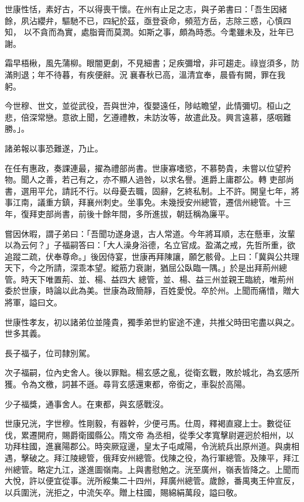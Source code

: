 \begin{pinyinscope}
 世康性恬，素好古，不以得喪干懷。在州有止足之志，與子弟書曰：「吾生因緒餘，夙沾纓弁，驅馳不已，四紀於茲，亟登袞命，頻蒞方岳，志除三惑，心慎四知，
 以不貪而為實，處脂膏而莫潤。如斯之事，頗為時悉。今耄雖未及，壯年已謝。



 霜早梧楸，風先蒲柳。眼闇更劇，不見細書；足疾彌增，非可趨走。祿豈須多，防滿則退；年不待暮，有疾便辭。況襄春秋已高，溫清宜奉，晨昏有闕，罪在我躬。



 今世穆、世文，並從武役，吾與世沖，復嬰遠任，陟岵瞻望，此情彌切。桓山之悲，倍深常戀。意欲上聞，乞遵禮教，未訪汝等，故遣此及。興言遠慕，感咽難勝。」。



 諸弟報以事恐難遂，乃止。



 在任有惠政，奏課連最，擢為禮部尚書。世康寡嗜慾，不慕勢貴，未嘗以位望矜物。聞人之善，若己有之，亦不顯人過咎，以求名譽。進爵上庸郡公。轉
 吏部尚書，選用平允，請託不行。以母憂去職，固辭，乞終私制。上不許。開皇七年，將事江南，議重方鎮，拜襄州刺史。坐事免。未幾授安州總管，遷信州總管。十三年，復拜吏部尚書，前後十餘年間，多所進拔，朝廷稱為廉平。



 嘗因休暇，謂子弟曰：「吾聞功遂身退，古人常道。今年將耳順，志在懸車，汝輩以為云何？」子福嗣答曰：「大人澡身浴德，名立官成。盈滿之戒，先哲所重，欲追蹤二疏，伏奉尊命。」後因侍宴，世康再拜陳讓，願乞骸骨。上曰：「冀與公共理天下，今之所請，深乖本望。縱筋力衰謝，猶屈公臥臨一隅。」於是出拜荊州總管。時天下唯置荊、並、楊、益四大
 總管，並、楊、益三州並親王臨統，唯荊州委於世康，時論以此為美。世康為政簡靜，百姓愛悅。卒於州。上聞而痛惜，贈大將軍，謚曰文。



 世康性孝友，初以諸弟位並隆貴，獨季弟世約宦途不達，共推父時田宅盡以與之。世多其義。



 長子福子，位司隸別駕。



 次子福嗣，位內史舍人。後以罪黜。楊玄感之亂，從衛玄戰，敗於城北，為玄感所獲。令為文檄，詞甚不遜。尋背玄感還東都，帝銜之，車裂於高陽。



 少子福獎，通事舍人。在東都，與玄感戰沒。



 世康兄洸，字世穆。性剛毅，有器幹，少便弓馬。仕周，釋褐直寢上士。數從征伐，累遷開府，賜爵衛國縣公。隋文帝
 為丞相，從季父孝寬擊尉遲迥於相州，以功拜柱國，進襄陽郡公。時突厥寇邊，皇太子屯咸陽，令洸統兵出原州道。與虜相遇，擊破之。拜江陵總管，俄拜安州總管。伐陳之役，為行軍總管。及陳平，拜江州總管。略定九江，遂進圖嶺南。上與書慰勉之。洸至廣州，嶺表皆降之。上聞而大悅，許以便宜從事。洸所綏集二十四州，拜廣州總管。歲餘，番禺夷王仲宣反，以兵圍洸，洸拒之，中流矢卒。贈上柱國，賜綿絹萬段，謚曰敬。




\end{pinyinscope}
